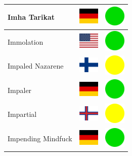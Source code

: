 \documentclass[12pt, a4paper, twoside]{report}
\begin{document}
\begin{center}
\begin{longtable}{|p{5cm}|p{2cm}|p{2cm}|}
 Imha Tarikat                                               & \includegraphics[width=1cm]{../img/flags/de} &   \includegraphics[width=1cm]{../likes/y} \\ \hline
 Immolation                                                 & \includegraphics[width=1cm]{../img/flags/us} &   \includegraphics[width=1cm]{../likes/y} \\ \hline
 Impaled Nazarene                                           & \includegraphics[width=1cm]{../img/flags/fi} &   \includegraphics[width=1cm]{../likes/m} \\ \hline
 Impaler                                                    & \includegraphics[width=1cm]{../img/flags/de} &   \includegraphics[width=1cm]{../likes/y} \\ \hline
 Impartial                                                  & \includegraphics[width=1cm]{../img/flags/fo} &   \includegraphics[width=1cm]{../likes/m} \\ \hline
 Impending Mindfuck                                         & \includegraphics[width=1cm]{../img/flags/de} &   \includegraphics[width=1cm]{../likes/y} \\ \hline

\end{longtable}
\end{center}
\end{document}
